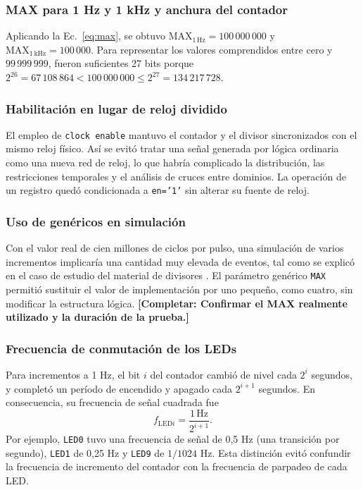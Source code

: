 \documentclass[conference]{IEEEtran}
\newcommand{\completar}[1]{\textcolor{pendiente}{\textbf{[Completar: #1]}}}
\begin{document}
\subsubsection{MAX para 1 Hz y 1 kHz y anchura del contador}
Aplicando la Ec.~\eqref{eq:max}, se obtuvo \(\mathrm{MAX}_{1\,\mathrm{Hz}}=100\,000\,000\) y \(\mathrm{MAX}_{1\,\mathrm{kHz}}=100\,000\). Para representar los valores comprendidos entre cero y \(99\,999\,999\), fueron suficientes 27 bits porque \(2^{26}=67\,108\,864<100\,000\,000\leq 2^{27}=134\,217\,728\).

\subsubsection{Habilitación en lugar de reloj dividido}
El empleo de \texttt{clock enable} mantuvo el contador y el divisor sincronizados con el mismo reloj físico. Así se evitó tratar una señal generada por lógica ordinaria como una nueva red de reloj, lo que habría complicado la distribución, las restricciones temporales y el análisis de cruces entre dominios. La operación de un registro quedó condicionada a \texttt{en='1'} sin alterar su fuente de reloj.

\subsubsection{Uso de genéricos en simulación}
Con el valor real de cien millones de ciclos por pulso, una simulación de varios incrementos implicaría una cantidad muy elevada de eventos, tal como se explicó en el caso de estudio del material de divisores \cite{cursodiv}. El parámetro genérico \texttt{MAX} permitió sustituir el valor de implementación por uno pequeño, como cuatro, sin modificar la estructura lógica. \completar{Confirmar el MAX realmente utilizado y la duración de la prueba.}

\subsubsection{Frecuencia de conmutación de los LEDs}
Para incrementos a 1 Hz, el bit \(i\) del contador cambió de nivel cada \(2^i\) segundos, y completó un período de encendido y apagado cada \(2^{i+1}\) segundos. En consecuencia, su frecuencia de señal cuadrada fue
\begin{equation}
f_{\mathrm{LED}i}=\frac{1\,\mathrm{Hz}}{2^{i+1}}.
\end{equation}
Por ejemplo, \texttt{LED0} tuvo una frecuencia de señal de 0,5 Hz (una transición por segundo), \texttt{LED1} de 0,25 Hz y \texttt{LED9} de \(1/1024\) Hz. Esta distinción evitó confundir la frecuencia de incremento del contador con la frecuencia de parpadeo de cada LED.
\end{document}
